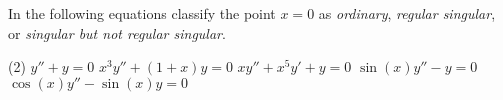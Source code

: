 \documentclass{ximera}
\begin{document}
\begin{exercise}%
    In the following equations classify the point $x=0$ as \emph{ordinary}, \emph{regular singular}, or \emph{singular but not regular singular}.
    \begin{tasks}(2)
        \task $y''+y=0$
        \task $x^3y''+(1+x)y=0$
        \task $xy''+x^5y'+y=0$
        \task $\sin(x)y''-y=0$
        \task $\cos(x)y''-\sin(x)y=0$
    \end{tasks}
\end{exercise}
%
\end{document}

